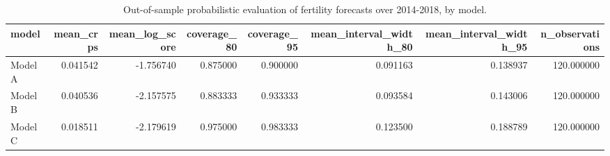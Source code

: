 \begin{table}[ht]
\centering
\begin{tabular}{lrrrrrrr}
\hline
model & mean_crps & mean_log_score & coverage_80 & coverage_95 & mean_interval_width_80 & mean_interval_width_95 & n_observations \\
\hline
Model A & 0.041542 & -1.756740 & 0.875000 & 0.900000 & 0.091163 & 0.138937 & 120.000000 \\
Model B & 0.040536 & -2.157575 & 0.883333 & 0.933333 & 0.093584 & 0.143006 & 120.000000 \\
Model C & 0.018511 & -2.179619 & 0.975000 & 0.983333 & 0.123500 & 0.188789 & 120.000000 \\
\hline
\end{tabular}
\caption{Out-of-sample probabilistic evaluation of fertility forecasts over 2014-2018, by model.}
\label{tab:new_table_7_5}
\end{table}
